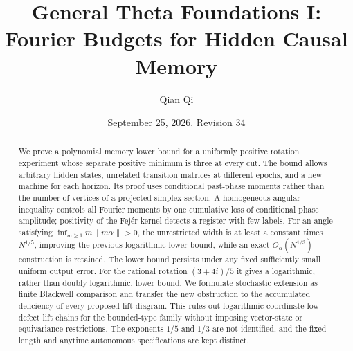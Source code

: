 \documentclass[11pt]{amsart}
\title[Fourier budgets and hidden causal memory]{General Theta Foundations I:\\
Fourier Budgets for Hidden Causal Memory}
\author{Qian Qi}
\date{September 25, 2026. Revision 34}
\theoremstyle{definition}\newtheorem{definition}[theorem]{Definition}
\theoremstyle{remark}\newtheorem{remark}[theorem]{Remark}
\begin{document}
\begin{abstract}
We prove a polynomial memory lower bound for a uniformly positive rotation
experiment whose separate positive minimum is three at every cut. The bound
allows arbitrary hidden states, unrelated transition matrices at different
epochs, and a new machine for each horizon. Its proof uses conditional
past-phase moments rather than the number of vertices of a projected
simplex section. A homogeneous angular inequality controls all Fourier
moments by one cumulative loss of conditional phase amplitude; positivity
of the Fej\'er kernel detects a register with few labels. For an angle
satisfying $\inf_{m\ge1}m\|m\alpha\|>0$, the unrestricted width is at
least a constant times $N^{1/5}$, improving the previous logarithmic lower
bound, while an exact $O_\alpha(N^{1/3})$ construction is retained.
The lower bound persists under any fixed sufficiently small uniform
output error. For the rational rotation $(3+4i)/5$ it gives a logarithmic,
rather than doubly logarithmic, lower bound. We formulate stochastic
extension as finite Blackwell comparison and transfer the new obstruction
to the accumulated deficiency of every proposed lift diagram. This rules
out logarithmic-coordinate low-defect lift chains for the bounded-type
family without imposing vector-state or equivariance restrictions. The
exponents $1/5$ and $1/3$ are not identified, and the fixed-length and
anytime autonomous specifications are kept distinct.
\end{abstract}
\maketitle








\end{document}
